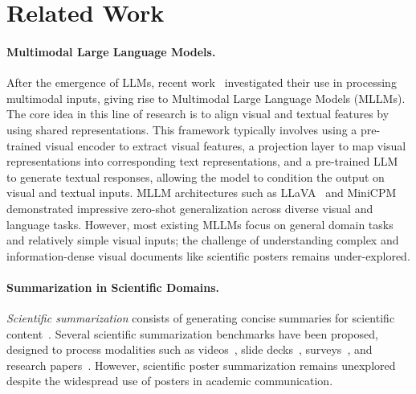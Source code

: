 \section{Related Work}
\paragraph{Multimodal Large Language Models.}
%
After the emergence of LLMs, recent work~\citep{DBLP:conf/nips/LiuLWL23a, DBLP:journals/corr/abs-2311-03079, DBLP:conf/nips/AlayracDLMBHLMM22} investigated their use in processing multimodal inputs, giving rise to Multimodal Large Language Models (MLLMs).
%
The core idea in this line of research is to align visual and textual features by using shared representations.
%
This framework typically involves using a pre-trained visual encoder to extract visual features, a projection layer to map visual representations into corresponding text representations, and a pre-trained LLM to generate textual responses, allowing the model to condition the output on visual and textual inputs.
%
MLLM architectures such as LLaVA~\cite{DBLP:conf/nips/LiuLWL23a} and MiniCPM~\cite{yao2024minicpmvgpt4vlevelmllm} demonstrated impressive zero-shot generalization across diverse visual and language tasks.
%
However, most existing MLLMs focus on general domain tasks and relatively simple visual inputs; the challenge of understanding complex and information-dense visual documents like scientific posters remains under-explored.
%

%
\paragraph{Summarization in Scientific Domains.}
%
\emph{Scientific summarization} consists of generating concise summaries for scientific content~\citep{ScisummNet,DBLP:conf/emnlp/CacholaLCW20,DBLP:conf/emnlp/JuLKJDP21,DBLP:conf/naacl/SotudehG22}.
%
Several scientific summarization benchmarks have been proposed, %
designed to process modalities such as videos~\cite{DBLP:conf/acl/LevSHJK19,m3av}, slide decks~\cite{DBLP:conf/aaai/TanakaNNHSS23}, surveys~\cite{DBLP:conf/acl/LiuLYZJLH24}, 
and research papers~\cite{DBLP:conf/naacl/TakeshitaGR0P24,DBLP:conf/coling/PuWLD24}. 
%
However, scientific poster summarization remains unexplored despite the widespread use of posters in academic communication.

%
